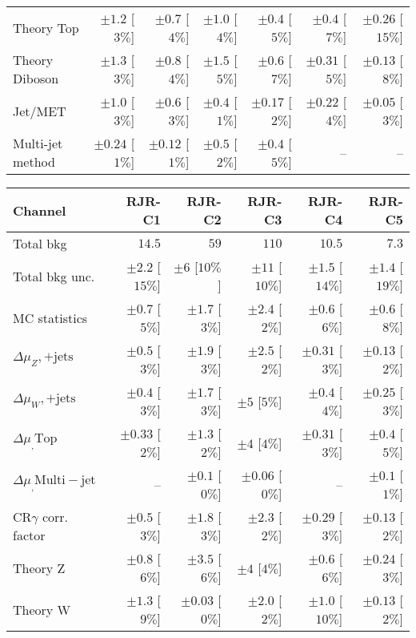 \begin{table}[H]
\begin{center}
\begin{tabular}{|lrrrrrr|}
Theory Top   &  $\pm 1.2$ [$3\%$]  &  $\pm 0.7$ [$4\%$]  &  $\pm 1.0$ [$4\%$]  &  $\pm 0.4$ [$5\%$]  &  $\pm 0.4$ [$7\%$]  &  $\pm 0.26$ [$15\%$] \\
Theory Diboson  &  $\pm 1.3$ [$3\%$]  &  $\pm 0.8$ [$4\%$]  &  $\pm 1.5$ [$5\%$]  &  $\pm 0.6$ [$7\%$]  &  $\pm 0.31$ [$5\%$]  &  $\pm 0.13$ [$8\%$] \\
Jet/MET   &  $\pm 1.0$ [$3\%$]  &  $\pm 0.6$ [$3\%$]  &  $\pm 0.4$ [$1\%$]  &  $\pm 0.17$ [$2\%$]  &  $\pm 0.22$ [$4\%$]  &  $\pm 0.05$ [$3\%$] \\
Multi-jet method  &  $\pm 0.24$ [$1\%$]  &  $\pm 0.12$ [$1\%$]  &  $\pm 0.5$ [$2\%$]  &  $\pm 0.4$ [$5\%$]  &   --    &   --   \\
\hline
\end{tabular}

\begin{tabular}{|lrrrrr|}
\hline
Channel  & \textbf{ RJR-C1 } & \textbf{ RJR-C2 } & \textbf{ RJR-C3 } & \textbf{ RJR-C4 } & \textbf{ RJR-C5 } \\ \hline
Total bkg  &  $14.5$  &  $59$  &  $110$  &  $10.5$  &  $7.3$ \\
Total bkg unc.  &  $\pm 2.2$  [$15\%$]  &  $\pm 6$  [$10\%$]  &  $\pm 11$  [$10\%$]  &  $\pm 1.5$  [$14\%$]  &  $\pm 1.4$  [$19\%$] \\
\hline
MC statistics  &  $\pm 0.7$ [$5\%$]  &  $\pm 1.7$ [$3\%$]  &  $\pm 2.4$ [$2\%$]  &  $\pm 0.6$ [$6\%$]  &  $\pm 0.6$ [$8\%$] \\
$\Delta\mu_Z,\mathrm{+jets}$  &  $\pm 0.5$ [$3\%$]  &  $\pm 1.9$ [$3\%$]  &  $\pm 2.5$ [$2\%$]  &  $\pm 0.31$ [$3\%$]  &  $\pm 0.13$ [$2\%$] \\
$\Delta\mu_W,\mathrm{+jets}$ &  $\pm 0.4$ [$3\%$]  &  $\pm 1.7$ [$3\%$]  &  $\pm 5$ [$5\%$]  &  $\pm 0.4$ [$4\%$]  &  $\pm 0.25$ [$3\%$] \\
$\Delta\mu_,\mathrm{ Top}$  &  $\pm 0.33$ [$2\%$]  &  $\pm 1.3$ [$2\%$]  &  $\pm 4$ [$4\%$]  &  $\pm 0.31$ [$3\%$]  &  $\pm 0.4$ [$5\%$] \\
$\Delta\mu_,\mathrm{ Multi-jet}$  &  --  &  $\pm 0.1$ [$0\%$]  &  $\pm 0.06$ [$0\%$]  &   --    &  $\pm 0.1$ [$1\%$] \\
CR$\gamma$ corr. factor  &  $\pm 0.5$ [$3\%$]  &  $\pm 1.8$ [$3\%$]  &  $\pm 2.3$ [$2\%$]  &  $\pm 0.29$ [$3\%$]  &  $\pm 0.13$ [$2\%$] \\
Theory Z  &  $\pm 0.8$ [$6\%$]  &  $\pm 3.5$ [$6\%$]  &  $\pm 4$ [$4\%$]  &  $\pm 0.6$ [$6\%$]  &  $\pm 0.24$ [$3\%$] \\
Theory W  &  $\pm 1.3$ [$9\%$]  &  $\pm 0.03$ [$0\%$]  &  $\pm 2.0$ [$2\%$]  &  $\pm 1.0$ [$10\%$]  &  $\pm 0.13$ [$2\%$] \\

\end{tabular}
\end{center}
\end{table}

